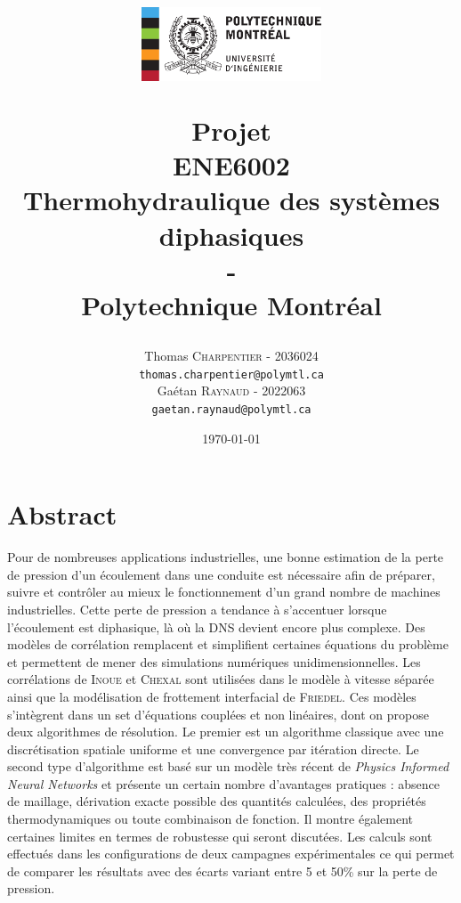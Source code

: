 \documentclass[12pt]{article}
\title{
\centerline{\includegraphics[width=0.4\textwidth]{images/poly}}
\vspace{0.5 cm}
Projet \\
\vspace{1cm}
ENE6002
\large  \\
Thermohydraulique des systèmes diphasiques \\ 
\Huge-\\
\normalsize Polytechnique Montréal
  }
\author{
    \begin{minipage}{.46\textwidth}
        \begin{center}
            Thomas \textsc{Charpentier} - 2036024\\
            \texttt{thomas.charpentier@polymtl.ca}
        \end{center}
    \end{minipage}%
    \hfill\vrule\hfill
    \begin{minipage}{0.46\textwidth}
        \begin{center}
            Gaétan \textsc{Raynaud} - 2022063\\
            \texttt{gaetan.raynaud@polymtl.ca}
        \end{center}
    \end{minipage}
}
\date{\today}
\begin{document}
\maketitle
\section*{Abstract}

Pour de nombreuses applications industrielles, une bonne estimation de la perte de pression d'un écoulement dans une conduite est nécessaire afin de préparer, suivre et contrôler au mieux le fonctionnement d'un grand nombre de machines industrielles. Cette perte de pression a tendance à s'accentuer lorsque l'écoulement est diphasique, là où la DNS devient encore plus complexe. Des modèles de corrélation remplacent et simplifient certaines équations du problème et permettent de mener des simulations numériques unidimensionnelles. Les corrélations de \textsc{Inoue} et \textsc{Chexal} sont utilisées dans le modèle à vitesse séparée ainsi que la modélisation de frottement interfacial de \textsc{Friedel}. Ces modèles s'intègrent dans un set d'équations couplées et non linéaires, dont on propose deux algorithmes de résolution. Le premier est un algorithme \og classique\fg{} avec une discrétisation spatiale uniforme et une convergence par itération directe. Le second type d'algorithme est basé sur un modèle très récent de \textit{Physics Informed Neural Networks} et présente un certain nombre d'avantages pratiques : absence de maillage, dérivation exacte possible des quantités calculées, des propriétés thermodynamiques ou toute combinaison de fonction. Il montre également certaines limites en termes de robustesse qui seront discutées. Les calculs sont effectués dans les configurations de deux campagnes expérimentales ce qui permet de comparer les résultats avec des écarts variant entre 5 et 50\% sur la perte de pression.

\newpage
\tableofcontents
\newpage

\newpage

\newpage

\newpage

\newpage

\newpage

\newpage
%

\FloatBarrier
\newpage


\end{document}
